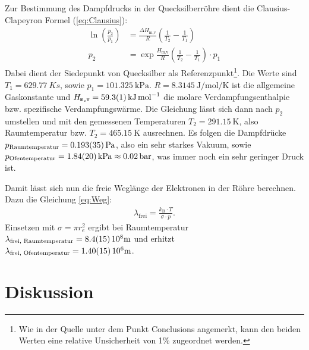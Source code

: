 	Zur Bestimmung des Dampfdrucks in der Quecksilberröhre dient die Clausius-Clapeyron Formel (\ref{eq:Clausius}):
	\begin{align} \label{eq:Clausius}
		\ln(\frac{p_2}{p_1}) &= \frac{\Delta H_\text{m,v}}{R}\left( \frac{1}{T_2} - \frac{1}{T_1} \right) \\
		p_2 &= \exp{\frac{H_\text{m,v}}{R} \left( \frac{1}{T_2} - \frac{1}{T_1} \right) } \cdot p_1
	\end{align}
	Dabei dient der Siedepunkt von Quecksilber als Referenzpunkt\cite{boilingPoint}\footnote{Wie in der Quelle unter dem Punkt Conclusions angemerkt, kann den beiden Werten eine relative Unsicherheit von 1\% zugeordnet werden.}.
	Die Werte sind $T_1 = \SI{629.77}{K}s$, sowie $p_1 = \SI{101.325}{\kilo\pascal}$.
	$R = \SI{8.3145}{\joule\per\mol\per\kelvin}$ ist die allgemeine Gaskonstante\cite{Constants} und $H_\texttt{m,v} = \SI{59.3+-0.1}{\kilo\joule\per\mol}$ die molare Verdampfungsenthalpie bzw. spezifische Verdampfungswärme\cite{verdampfungswaerme}.
	Die Gleichung lässt sich dann nach $p_2$ umstellen und mit den gemessenen Temperaturen $T_2 = \SI{291.15}{\kelvin}$, also Raumtemperatur bzw. $T_2 = \SI{465.15}{\kelvin}$ ausrechnen.
	Es folgen die Dampfdrücke $p_\text{Raumtemperatur} = \SI{0.193+-0.035}{\pascal}$, also ein sehr starkes Vakuum, sowie $p_\text{Ofentemperatur} = \SI{1.84+-0.20}{\kilo\pascal}\approx \SI{0.02}{\bar}$, was immer noch ein sehr geringer Druck ist.
	
	Damit lässt sich nun die freie Weglänge der Elektronen in der Röhre berechnen.
	Dazu die Gleichung \ref{eq:Weg}:
	\begin{align} \label{eq:Weg}
		\lambda_\text{frei} = \frac{k_\text{B}\cdot T}{\sigma\cdot p}.
	\end{align}
 	Einsetzen mit $\sigma = \pi r_e^2$\cite{Constants} ergibt bei Raumtemperatur $\lambda_\text{frei, Raumtemperatur} = \SI{8.4+-1.5}{10^8\meter}$ und erhitzt $\lambda_\text{frei, Ofentemperatur} = \SI{1.40+-0.15}{10^6\meter}$. 

\section{Diskussion}
	
